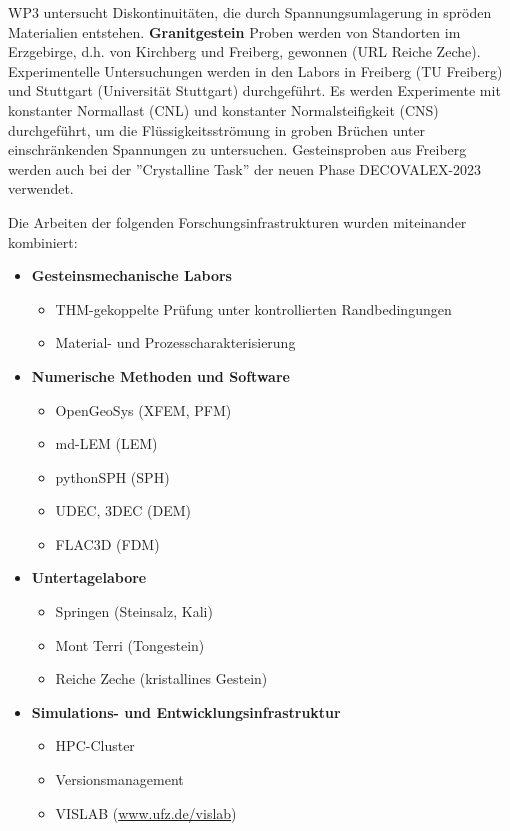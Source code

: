 WP3 untersucht Diskontinuitäten, die durch Spannungsumlagerung in spröden Materialien entstehen. \textbf{Granitgestein} Proben werden von Standorten im Erzgebirge, d.h. von Kirchberg und Freiberg, gewonnen (URL Reiche Zeche). Experimentelle Untersuchungen werden in den Labors in Freiberg (TU Freiberg) und Stuttgart (Universität Stuttgart) durchgeführt. Es werden Experimente mit konstanter Normallast (CNL) und konstanter Normalsteifigkeit (CNS) durchgeführt, um die Flüssigkeitsströmung in groben Brüchen unter einschränkenden Spannungen zu untersuchen. Gesteinsproben aus Freiberg werden auch bei der ''Crystalline Task'' der neuen Phase DECOVALEX-2023 verwendet.

Die Arbeiten der folgenden Forschungsinfrastrukturen wurden miteinander kombiniert:
\begin{itemize}
    \item \textbf{Gesteinsmechanische Labors}
	\begin{itemize}
		\item THM-gekoppelte Prüfung unter kontrollierten Randbedingungen
		\item Material- und Prozesscharakterisierung
	\end{itemize}
	\item \textbf{Numerische Methoden und Software}
	\begin{itemize}
		\item OpenGeoSys (XFEM, PFM)
		\item md-LEM (LEM)
		\item pythonSPH (SPH)
		\item UDEC, 3DEC (DEM)
		\item FLAC3D (FDM)
	\end{itemize}
	\item \textbf{Untertagelabore}
	\begin{itemize}
		\item Springen (Steinsalz, Kali)
		\item Mont Terri (Tongestein)
		\item Reiche Zeche (kristallines Gestein)
	\end{itemize}
	\item \textbf{Simulations- und Entwicklungsinfrastruktur}
	\begin{itemize}
		\item HPC-Cluster
		\item Versionsmanagement
		\item VISLAB (\url{www.ufz.de/vislab})
	\end{itemize}
\end{itemize}


